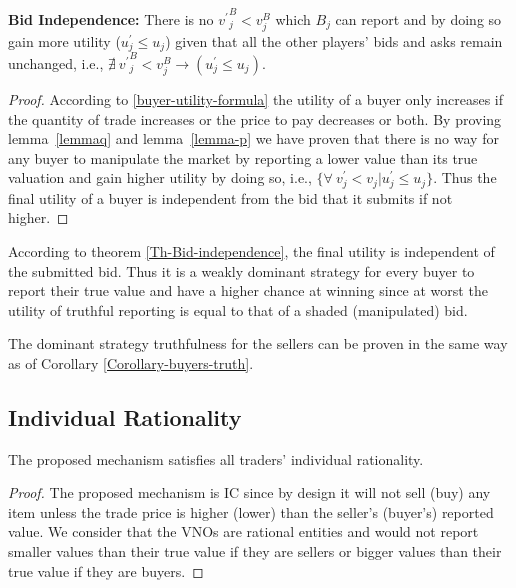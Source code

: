 \begin{Theorem}\textbf{{Bid Independence:}} There is no ${v^\prime}^B_{j} < v^B_{j}$ which $B_{j}$ can report and by doing so gain more utility (${u_{j}^\prime} \leq u_{j}$) given that all the other players' bids and asks remain unchanged, i.e., $\nexists \ {{v^\prime}^B_{j} < v^B_{j}}\rightarrow ({u_{j}^\prime} \leq u_{j})$.
\label{Th-Bid-independence}
\end{Theorem}
\begin{proof}
According to \autoref{buyer-utility-formula} the utility of a buyer only increases if the quantity of trade increases or the price to pay decreases or both. By proving lemma~\ref{lemmaq} and lemma~\ref{lemma-p} we have proven that there is no way for any buyer to manipulate the market by reporting a lower value than its true valuation and gain higher utility by doing so, i.e., $\{\forall \ v^\prime_j < v_j | u^\prime_{j} \leq u_{j} \}$. Thus the final utility of a buyer is independent from the bid that it submits if not higher.
\end{proof}

\begin{Corollary}
According to theorem \ref{Th-Bid-independence}, the final utility is independent of the submitted bid. Thus it is a weakly dominant strategy for every buyer to report their true value and have a higher chance at winning since at worst the utility of truthful reporting is equal to that of a shaded (manipulated) bid.
\label{Corollary-buyers-truth}
\end{Corollary}
\begin{Corollary}
The dominant strategy truthfulness for the sellers can be proven in the same way as of Corollary \ref{Corollary-buyers-truth}.
\label{Corollary-sellers-truth}
\end{Corollary}

\subsection{Individual Rationality}
\begin{Theorem}
The proposed mechanism satisfies all traders' individual rationality.
\end{Theorem}
\begin{proof}
The proposed mechanism is \ac{IC} since by design it will not sell (buy) any item unless the trade price is higher (lower) than the seller's (buyer's) reported value. We consider that the \acp{VNO} are rational entities and would not report smaller values than their true value if they are sellers or bigger values than their true value if they are buyers.
\end{proof}

